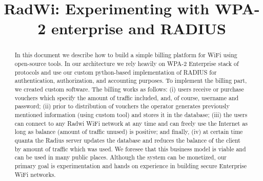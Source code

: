 \documentclass[conference,10pt,letter]{IEEEtran}
\begin{document}
\sloppy
\title{RadWi: Experimenting with WPA-2 enterprise and RADIUS}
\maketitle
\begin{abstract}
In this document we describe how to build a simple billing platform
for WiFi using open-source tools. In our architecture we rely heavily on 
WPA-2 Enterprise stack of protocols and use our custom python-based implementation of RADIUS 
for authentication, authorization, and accounting purposes. To implement the billing part, 
we created custom software. The billing works as follows: 
(i) users receive or purchase vouchers which specify the amount of traffic 
included, and, of course, username and password; 
(ii) prior to distribution of vouchers the operator generates previously 
mentioned information (using custom tool) and stores it in the database; 
(iii) the users can connect to any Radwi 
WiFi network at any time and can freely use the Internet as long as 
balance (amount of traffic unused) is positive; and finally, (iv) 
at certain time quanta the Radius server updates the database and reduces the 
balance of the client by amount of traffic which was used. We foresee that this 
business model is viable and can be used in many public places. Although
the system can be monetized, our primary goal is experimentation and hands 
on experience in building secure Enterprise WiFi networks.
\end{abstract}








\end{document}
